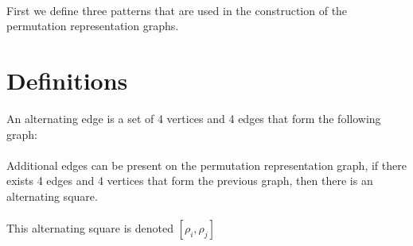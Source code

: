 \paragraph{}
First we define three patterns that are used in the construction of the permutation representation graphs.

\section{Definitions}
\begin{definition}
  An alternating edge is a set of 4 vertices and 4 edges that form the following graph:

  \begin{figure}[H]
    \begin{center}
      \caption{}
    \end{center}
  \end{figure}

  \paragraph{}
  Additional edges can be present on the permutation representation graph, if there exists 4 edges and 4 vertices that form the previous graph, then there is an alternating square.

  \paragraph{}
  This alternating square is denoted $[\rho_i, \rho_j]$
\end{definition}

